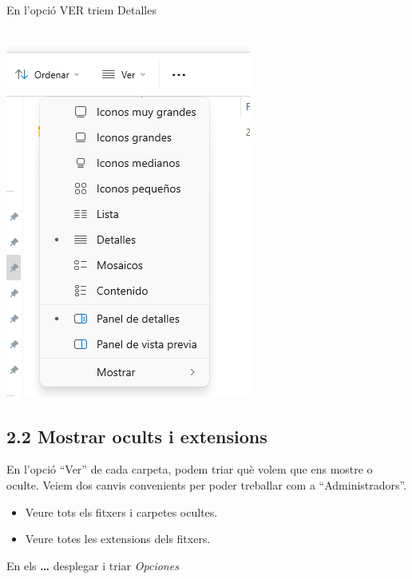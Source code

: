 \documentclass[
  a4paper,
]{article}
\providecommand{\tightlist}{%
  \setlength{\itemsep}{0pt}\setlength{\parskip}{0pt}}
\begin{document}
En l'opció VER triem Detalles

\includegraphics{png/verVistaDetalle0.png}

\subsection{2.2 Mostrar ocults i
extensions}\label{mostrar-ocults-i-extensions}

En l'opció ``Ver'' de cada carpeta, podem triar què volem que ens mostre
o oculte. Veiem dos canvis convenients per poder treballar com a
``Administradors''.

\begin{itemize}
\tightlist
\item
  Veure tots els fitxers i carpetes ocultes.
\item
  Veure totes les extensions dels fitxers.
\end{itemize}

En els \textbf{\ldots{}} desplegar i triar \emph{Opciones}
\end{document}
